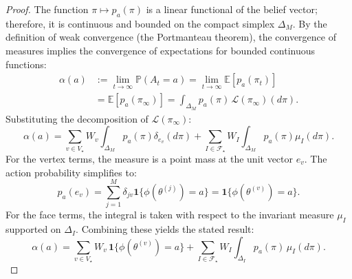 \documentclass[12pt]{article}
\begin{document}
\begin{proof}
    The function $\pi \mapsto p_a(\pi)$ is a linear functional of the belief vector; therefore, it is continuous and bounded on the compact simplex $\Delta_M$. By the definition of weak convergence (the Portmanteau theorem), the convergence of measures implies the convergence of expectations for bounded continuous functions:
    \begin{align}
        \alpha(a) &:= \lim_{t \to \infty} \mathbb{P}(A_t = a) = \lim_{t \to \infty} \mathbb{E}[p_a(\pi_t)] \nonumber \\
        &= \mathbb{E}[p_a(\pi_\infty)] = \int_{\Delta_M} p_a(\pi) \, \mathcal{L}(\pi_\infty)(d\pi).
    \end{align}
    Substituting the decomposition of $\mathcal{L}(\pi_\infty)$:
    \begin{equation}
        \alpha(a) = \sum_{v \in V_\star} W_v \int_{\Delta_M} p_a(\pi) \delta_{e_v}(d\pi) + \sum_{I \in \mathcal{F}_\star} W_I \int_{\Delta_M} p_a(\pi) \mu_I(d\pi).
    \end{equation}
    For the vertex terms, the measure is a point mass at the unit vector $e_v$. The action probability simplifies to:
    \begin{equation}
        p_a(e_v) = \sum_{j=1}^M \delta_{jv} \mathbf{1}\{\phi(\theta^{(j)}) = a\} = \mathbf{1}\{\phi(\theta^{(v)}) = a\}.
    \end{equation}
    For the face terms, the integral is taken with respect to the invariant measure $\mu_I$ supported on $\Delta_I$. Combining these yields the stated result:
    \begin{equation}
        \alpha(a) = \sum_{v \in V_\star} W_v \, \mathbf{1}\{\phi(\theta^{(v)})=a\} + \sum_{I \in \mathcal{F}_\star} W_I \int_{\Delta_I} p_a(\pi) \, \mu_I(d\pi).
    \end{equation}
\end{proof}
\end{document}
